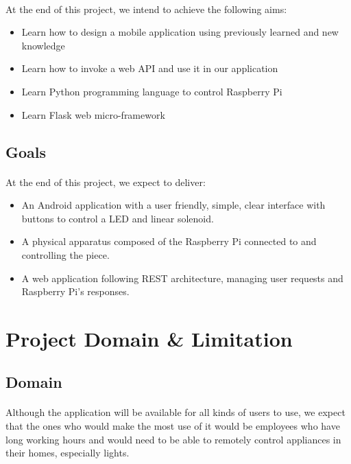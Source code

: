 \documentclass[12pt, oneside, a4paper]{book}
\begin{document}
			\paragraph{}At the end of this project, we intend to achieve the following aims:
			\begin{itemize}
	 			\item Learn how to design a mobile application using previously learned and new knowledge
				\item Learn how to invoke a web API and use it in our application
				\item Learn Python programming language to control Raspberry Pi
				\item Learn Flask web micro-framework
			\end{itemize}
		\subsection{Goals}
			\paragraph{} At the end of this project, we expect to deliver:
			\begin{itemize}
				\item An Android application with a user friendly, simple, clear interface with buttons to control a LED and linear solenoid.
				\item A physical apparatus composed of the Raspberry Pi connected to and controlling the piece.
				\item A web application following REST architecture, managing user  requests and Raspberry Pi's responses.
			\end{itemize}
		\section{Project Domain \& Limitation}
			\subsection{Domain}
				\paragraph{} Although the application will be available for all kinds of users to use, we expect that the ones who would make the most use of it would be employees who have long working hours and would need to be able to remotely control appliances in their homes, especially lights.
\end{document}
